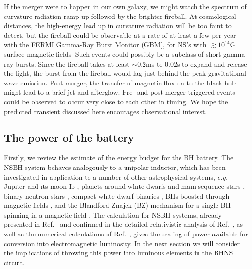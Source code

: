 If the merger were to happen in our own
galaxy, we might watch the spectrum of curvature radiation ramp up
followed by the brighter fireball. At cosmological distances, the
high-energy lead up in curvature radiation will be too faint to
detect, but the fireball could be observable at a rate of at least a
few per year with the FERMI Gamma-Ray Burst Monitor (GBM), for NS's
with $\gtrsim10^{14}$G surface magnetic fields.  Such events 
could possibly be a subclass of short gamma-ray
bursts. Since the fireball takes at least $\sim 0.2$ms to $0.02$s 
to expand and release the light, the burst from the
fireball would lag just behind the peak gravitational-wave emission.
Post-merger, the transfer of magnetic flux on to the black hole might
lead to a brief jet and afterglow. 
Pre- and post-merger triggered events could be observed to occur very close to each other in timing.
We hope the predicted transient discussed here encourages observational interest.



\subsection{The power of the battery}
\label{Orbital inspiral battery}
Firstly, we review the estimate of the energy budget for the BH
battery. The NSBH system behaves analogously to a unipolar inductor, which has been investigated in application 
to a number of other astrophysical systems, \textit{e.g.} Jupiter and 
its moon Io \citep{GLB:1969}, planets around white dwarfs \citep{Li:1998} and main sequence stars \citep{LaineLinI:2012,LaineLinII:2012}, 
binary neutron stars \citep{Vietri:1996,Piro:2012, DLai:2012, Palenzuela:2013}, 
compact white dwarf binaries \citep{Wu:2002, Dall'Osso:2006, Dall'Osso:2007, 
DLai:2012}, BHs boosted through magnetic fields 
\citep{Lyut:2011, Penna:2015}, and the Blandford-Znajek (BZ) mechanism \citep{BZ:1977} for a single BH spinning in a magnetic field  \citep[for recent numerical work on the BZ mechanism see \textit{e.g.}][]{PalenzuelaBZ:2011, Kiuchi:2015}. The calculation for NSBH systems, 
already presented in Ref.\ \cite{McL:2011}
and confirmed in the detailed relativistic analysis of
Ref.\ \cite{DL:2013}, as well as the numerical calculations
of Ref.\ \cite{Paschalidis:2013}, gives the scaling of power available
for conversion into electromagnetic luminosity. In the next section we
will consider the implications of throwing this power into luminous
elements in the BHNS circuit.

